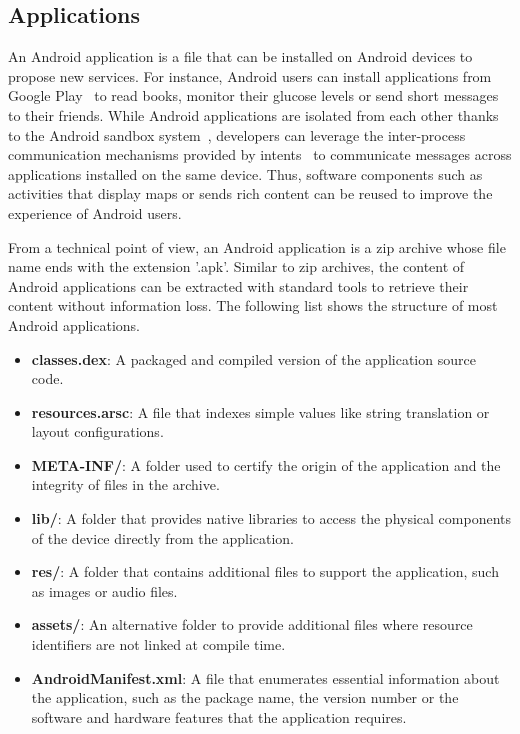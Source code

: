 \subsection{Applications}
An Android application is a file that can be installed on Android devices to propose new services.
For instance, Android users can install applications from Google Play~\cite{google_google_2019} to read books, monitor their glucose levels or send short messages to their friends.
While Android applications are isolated from each other thanks to the Android sandbox system~\cite{android_developers_application_2019}, developers can leverage the inter-process communication mechanisms provided by intents~\cite{android_developers_intents_2019} to communicate messages across applications installed on the same device.
Thus, software components such as activities that display maps or sends rich content can be reused to improve the experience of Android users.

From a technical point of view, an Android application is a zip archive whose file name ends with the extension '.apk'.
Similar to zip archives, the content of Android applications can be extracted with standard tools to retrieve their content without information loss.
The following list shows the structure of most Android applications.

\begin{itemize}
  \item \textbf{classes.dex}: A packaged and compiled version of the application source code.
  \item \textbf{resources.arsc}: A file that indexes simple values like string translation or layout configurations.
  \item \textbf{META-INF/}: A folder used to certify the origin of the application and the integrity of files in the archive.
  \item \textbf{lib/}: A folder that provides native libraries to access the physical components of the device directly from the application.
  \item \textbf{res/}: A folder that contains additional files to support the application, such as images or audio files.
  \item \textbf{assets/}: An alternative folder to provide additional files where resource identifiers are not linked at compile time.
  \item \textbf{AndroidManifest.xml}: A file that enumerates essential information about the application, such as the package name, the version number or the software and hardware features that the application requires.
\end{itemize}

